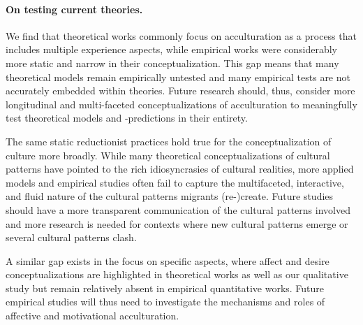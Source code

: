 \documentclass[man, 12pt, a4paper, mask]{apa7}
\begin{document}
\paragraph{On testing current theories.} We find that theoretical works commonly focus on acculturation as a process that includes multiple experience aspects, while empirical works were considerably more static and narrow in their conceptualization. This gap means that many theoretical models remain empirically untested and many empirical tests are not accurately embedded within theories. Future research should, thus, consider more longitudinal and multi-faceted conceptualizations of acculturation to meaningfully test theoretical models and -predictions in their entirety.

The same static reductionist practices hold true for the conceptualization of culture more broadly. While many theoretical conceptualizations of cultural patterns have pointed to the rich idiosyncrasies of cultural realities, more applied models and empirical studies often fail to capture the multifaceted, interactive, and fluid nature of the cultural patterns migrants (re-)create. Future studies should have a more transparent communication of the cultural patterns involved and more research is needed for contexts where new cultural patterns emerge or several cultural patterns clash.

A similar gap exists in the focus on specific aspects, where affect and desire conceptualizations are highlighted in theoretical works as well as our qualitative study but remain relatively absent in empirical quantitative works. Future empirical studies will thus need to investigate the mechanisms and roles of affective and motivational acculturation.

\end{document}
